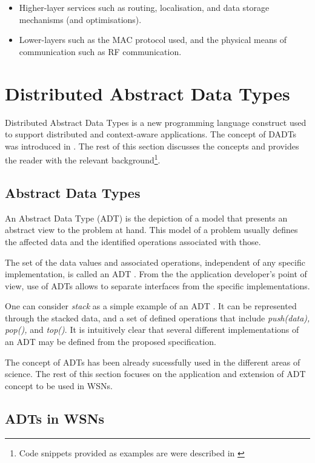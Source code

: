 \begin{itemize}
  \item Higher-layer services such as routing, localisation, and data storage
  mechanisms (and optimisations).
  \item Lower-layers such as the MAC protocol used, and the physical means of
  communication such as RF communication.
\end{itemize}

\section {Distributed Abstract Data Types} \label{sec:DADT}

Distributed Abstract Data Types is a new programming language construct used to
support distributed and context-aware applications. The concept of DADTs was
introduced in \cite{migliavacca_DADT:2006}. The rest of this section discusses the concepts and provides the reader with the relevant background\footnote{Code snippets provided as examples are
were described in \cite{migliavacca_DADT:2006}}.

\subsection{Abstract Data Types}

An Abstract Data Type (ADT) is the depiction of a model that
presents an abstract view to the problem at hand. This model of a problem
usually defines the affected data and the identified operations associated with
those.

The set of the data values and associated operations, independent of any
specific implementation, is called an ADT \cite{NIST_website}. From the the
application developer's point of view, use of ADTs allows to separate
interfaces from the specific implementations.

One can consider \emph{stack} as a simple example of an ADT \cite{guttag_ADTs:1977}. It
can be represented through the stacked data, and a set of defined
operations that include \emph{push(data), pop(),} and \emph{top()}. It is intuitively clear that
several different implementations of an ADT may be defined from the proposed specification.

The concept of ADTs has been already sucessfully used in the different areas of science. 
The rest of this section focuses on the application and extension of ADT
concept to be used in WSNs.

\subsection{ADTs in WSNs} \label{subsubsec:ADTsinWSN}

